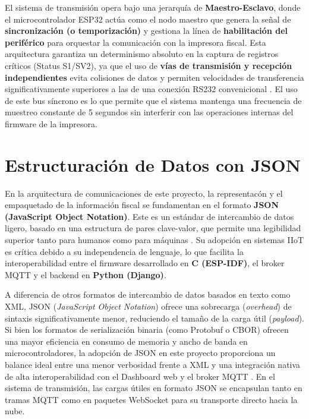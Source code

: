 \par El sistema de transmisi\'on opera bajo una jerarquía de \textbf{Maestro-Esclavo}, donde el microcontrolador ESP32 actúa como el nodo maestro que genera la señal de \textbf{sincronización (o temporización)} y gestiona la línea de \textbf{habilitación del periférico} para orquestar la comunicación con la impresora fiscal. Esta arquitectura garantiza un determinismo absoluto en la captura de registros críticos (Status S1/SV2), ya que el uso de \textbf{vías de transmisión y recepción independientes} evita colisiones de datos y permiten velocidades de transferencia significativamente superiores a las de una conexión RS232 convenicional \cite{TheFactoryHKA_Manual_Protocolos}. El uso de este bus síncrono es lo que permite que el sistema mantenga una frecuencia de muestreo constante de 5 segundos sin interferir con las operaciones internas del firmware de la impresora.

\section{Estructuraci\'on de Datos con JSON}

\par En la arquitectura de comunicaciones de este proyecto, la representac\'on y el empaquetado de la informaci\'on fiscal se fundamentan en el formato \textbf{JSON (JavaScript Object Notation)}. Este es un est\'andar de intercambio de datos ligero, basado en una estructura de pares clave-valor, que permite una legibilidad superior tanto para humanos como para m\'aquinas \cite{Salazar_IoT_2014}. Su adopción en sistemas IIoT es cr\'itica debido a su independencia de lenguaje, lo que facilita la interoperabilidad entre el firmware desarrollado en \textbf{C (ESP-IDF)}, el broker MQTT y el backend en \textbf{Python (Django)}.\\

\par A diferencia de otros formatos de intercambio de datos basados en texto como XML, JSON (\textit{JavaScript Object Notation}) ofrece una sobrecarga (\textit{overhead}) de sintaxis significativamente menor, reduciendo el tamaño de la carga útil (\textit{payload}). Si bien los formatos de serialización binaria (como Protobuf o CBOR) ofrecen una mayor eficiencia en consumo de memoria y ancho de banda en microcontroladores, la adopción de JSON en este proyecto proporciona un balance ideal entre una menor verbosidad frente a XML y una integración nativa de alta interoperabilidad con el Dashboard web y el broker MQTT \cite{OASIS_MQTT_v5}. En el sistema de transmisión, las cargas útiles en formato JSON se encapsulan tanto en tramas MQTT como en paquetes WebSocket para su transporte directo hacia la nube.

